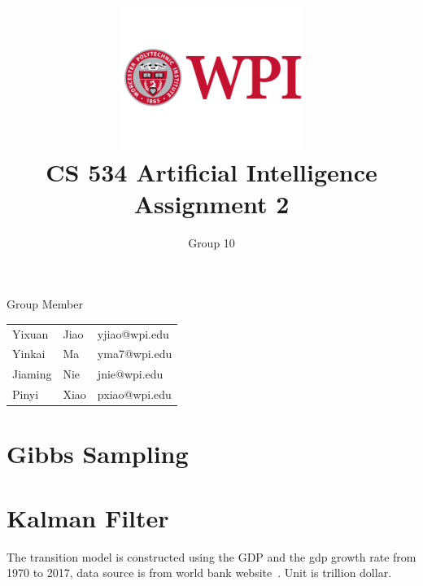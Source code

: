 \documentclass[11pt, a4paper]{article}
\title{\includegraphics[width=0.45\textwidth]{wpi2}
        \\CS 534 Artificial Intelligence \\ Assignment 2 }          %
\author{Group 10 }                    %
\begin{document}
\begin{titlepage}
	
\maketitle
{} %

\begin{center}
Group Member
\end{center}

\begin{table}[htbp] 
\begin{center}
\begin{tabular}{l l l} 
	 
	 Yixuan & Jiao  &   yjiao@wpi.edu \\
     Yinkai & Ma  &   yma7@wpi.edu \\
     Jiaming & Nie  &  jnie@wpi.edu \\
     Pinyi & Xiao  &  pxiao@wpi.edu \\
\end{tabular}
\end{center}
\end{table}



\thispagestyle{empty}  %

\end{titlepage}









\section{Gibbs Sampling}



\section{Kalman Filter}

The transition model is constructed using the GDP and the gdp growth rate from 1970 to 2017, data source is from world bank website~\cite{ref:source1}. Unit is trillion dollar.
\end{document}
